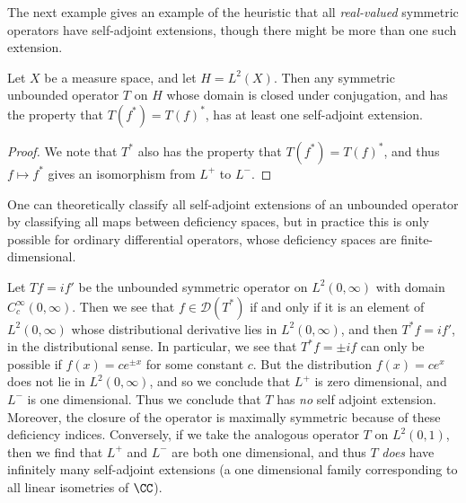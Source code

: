 The next example gives an example of the heuristic that all \emph{real-valued} symmetric operators have self-adjoint extensions, though there might be more than one such extension.

\begin{theorem}
    Let $X$ be a measure space, and let $H = L^2(X)$. Then any symmetric unbounded operator $T$ on $H$ whose domain is closed under conjugation, and has the property that $T(f^*) = T(f)^*$, has at least one self-adjoint extension.
\end{theorem}
\begin{proof}
    We note that $T^*$ also has the property that $T(f^*) = T(f)^*$, and thus $f \mapsto f^*$ gives an isomorphism from $L^+$ to $L^-$.
\end{proof}

One can theoretically classify all self-adjoint extensions of an unbounded operator by classifying all maps between deficiency spaces, but in practice this is only possible for ordinary differential operators, whose deficiency spaces are finite-dimensional.

\begin{example}
    Let $Tf = if'$ be the unbounded symmetric operator on $L^2(0,\infty)$ with domain $C_c^\infty(0,\infty)$. Then we see that $f \in \mathcal{D}(T^*)$ if and only if it is an element of $L^2(0,\infty)$ whose distributional derivative lies in $L^2(0,\infty)$, and then $T^*f = if'$, in the distributional sense. In particular, we see that $T^*f = \pm if$ can only be possible if $f(x) = c e^{\pm x}$ for some constant $c$. But the distribution $f(x) = c e^x$ does not lie in $L^2(0,\infty)$, and so we conclude that $L^+$ is zero dimensional, and $L^-$ is one dimensional. Thus we conclude that $T$ has \emph{no} self adjoint extension. Moreover, the closure of the operator is maximally symmetric because of these deficiency indices. Conversely, if we take the analogous operator $T$ on $L^2(0,1)$, then we find that $L^+$ and $L^-$ are both one dimensional, and thus $T$ \emph{does} have infinitely many self-adjoint extensions (a one dimensional family corresponding to all linear isometries of $\CC$).
\end{example}



